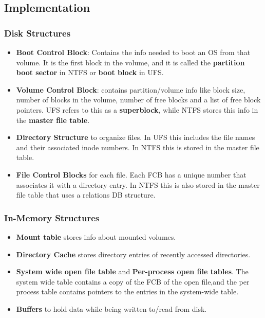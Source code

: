 \documentclass{article}
\theoremstyle{plain}
\theoremstyle{definition}
\begin{document}
\subsection{Implementation}

\subsubsection{Disk Structures}
\begin{itemize}
    \item \textbf{Boot Control Block}: Contains the info needed to boot an OS from that volume. It is the first block in the volume, and it is called the \textbf{partition boot sector} in NTFS or \textbf{boot block} in UFS.
    
    \item \textbf{Volume Control Block}: contains partition/volume info like block size, number of blocks in the volume, number of free blocks and a list of free block pointers. UFS refers to this as a \textbf{superblock}, while NTFS stores this info in the \textbf{master file table}. 
    
    \item \textbf{Directory Structure} to organize files. In UFS this includes the file names and their associated inode numbers. In NTFS this is stored in the master file table.
    
    \item \textbf{File Control Blocks} for each file. Each FCB has a unique number that associates it with a directory entry. In NTFS this is also stored in the master file table that uses a relations DB structure.
\end{itemize}

\subsubsection{In-Memory Structures}
\begin{itemize}
    \item \textbf{Mount table} stores info about mounted volumes. 
    
    \item \textbf{Directory Cache} stores directory entries of recently accessed directories. 
    
    \item \textbf{System wide open file table} and \textbf{Per-process open file tables}. The system wide table contains a copy of the FCB of the open file,and the per process table contains pointers to the entries in the system-wide table. 
    
    \item \textbf{Buffers} to hold data while being written to/read from disk. 
\end{itemize}
\end{document}

